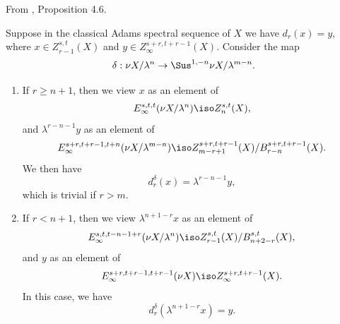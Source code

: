 \begin{proposition}
\label{paper:4.6}
From \cite{LWX126}, Proposition 4.6.\par
\label{prop:6de7d130}
    Suppose in the classical Adams spectral sequence of $X$ we have $d_r(x)=y$, where $x\in Z_{r-1}^{s,t}(X)$ and $y\in Z_\infty^{s+r,t+r-1}(X)$. Consider the map
    $$\delta:\nu X/\lambda^n\to \Sus^{1,-n}\nu X/\lambda^{m-n}.$$
    \begin{enumerate}
        \item If $r\ge n+1$, then we view $x$ as an element of 
        $$E_\infty^{s,t,t}(\nu X/\lambda^n)\iso Z_n^{s,t}(X),$$
        and $\lambda^{r-n-1} y$ as an element of 
        $$E_\infty^{s+r,t+r-1, t+n}(\nu X/\lambda^{m-n})\iso Z_{m-r+1}^{s+r,t+r-1}(X)/B_{r-n}^{s+r,t+r-1}(X).$$
        We then have
        $$d^{\delta}_r(x)=\lambda^{r-n-1}y,$$
        which is trivial if $r>m$.
        \item If $r<n+1$, then we view $\lambda^{n+1-r}x$ as an element of 
        $$E_\infty^{s,t,t-n-1+r}(\nu X/\lambda^n)\iso Z^{s,t}_{r-1}(X)/B^{s,t}_{n+2-r}(X),$$
        and $y$ as an element of 
        $$E_\infty^{s+r,t+r-1, t+r-1}(\nu X)\iso Z_\infty^{s+r,t+r-1}(X).$$
        In this case, we have
        $$d^{\delta}_r(\lambda^{n+1-r}x)=y.$$
    \end{enumerate}




\end{proposition}
